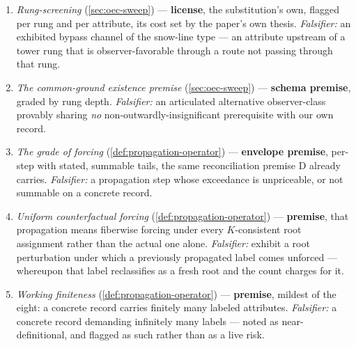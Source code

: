 \documentclass[11pt]{article}
\theoremstyle{definition}
\begin{document}
\begin{enumerate}
    \item \emph{Rung-screening} (\autoref{sec:oec-sweep}) --- \textbf{license}, the substitution's own, flagged per rung and per attribute, its cost set by the paper's own thesis. \emph{Falsifier:} an exhibited bypass channel of the snow-line type --- an attribute upstream of a tower rung that is observer-favorable through a route not passing through that rung.
    \item \emph{The common-ground existence premise} (\autoref{sec:oec-sweep}) --- \textbf{schema premise}, graded by rung depth. \emph{Falsifier:} an articulated alternative observer-class provably sharing \emph{no} non-outwardly-insignificant prerequisite with our own record.
    \item \emph{The grade of forcing} (\autoref{def:propagation-operator}) --- \textbf{envelope premise}, per-step with stated, summable tails, the same reconciliation premise D already carries. \emph{Falsifier:} a propagation step whose exceedance is unpriceable, or not summable on a concrete record.
    \item \emph{Uniform counterfactual forcing} (\autoref{def:propagation-operator}) --- \textbf{premise}, that propagation means fiberwise forcing under every $K$-consistent root assignment rather than the actual one alone. \emph{Falsifier:} exhibit a root perturbation under which a previously propagated label comes unforced --- whereupon that label reclassifies as a fresh root and the count charges for it.
    \item \emph{Working finiteness} (\autoref{def:propagation-operator}) --- \textbf{premise}, mildest of the eight: a concrete record carries finitely many labeled attributes. \emph{Falsifier:} a concrete record demanding infinitely many labels --- noted as near-definitional, and flagged as such rather than as a live risk.
\end{enumerate}
\end{document}
